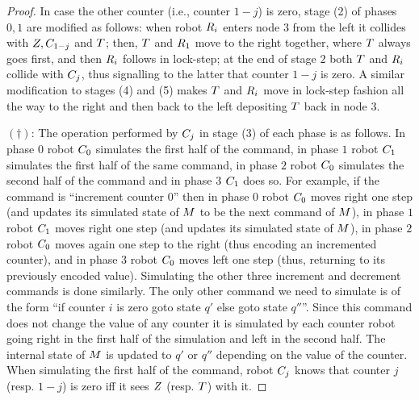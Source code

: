 \begin{proof}
In case the other counter (i.e., counter $1-j$) is zero, stage (2) of phases $0,1$ are modified as follows: when robot $R_i$ enters node $3$ from the left it collides with $Z, C_{1-j}$ and $T$; then, $T$ and $R_1$ move to the right together, where $T$ always goes first, and then $R_i$ follows in lock-step; at the end of stage $2$ both $T$ and $R_i$ collide with $C_j$, thus signalling to the latter that counter $1-j$ is zero. A similar modification to stages (4) and (5) makes $T$ and $R_i$ move in lock-step fashion all the way to the right and then back to the left depositing $T$ back in node $3$.
%


$(\dagger)$: The operation performed by $C_j$ in stage (3) of each phase is as follows.
In phase $0$ robot $C_0$ simulates the first half of the command, in phase $1$ robot $C_1$ simulates the first half of the same command, in phase $2$ robot $C_0$ simulates the second half of the command and in phase $3$ $C_1$ does so. For example, if the command is ``increment counter $0$'' then in phase $0$ robot $C_0$ moves right one step (and updates its simulated state of $M$ to be the next command of $M$), in phase $1$ robot $C_1$ moves right one step (and updates its simulated state of $M$), in phase $2$ robot $C_0$ moves again one step to the right (thus encoding an incremented counter), and in phase $3$ robot $C_0$ moves left one step (thus, returning to its previously encoded value). Simulating the other three increment and decrement commands is done similarly. The only other command we need to simulate is of the form ``if counter $i$ is zero goto state $q'$ else goto state $q''$''. Since this command does not change the value of any counter it is simulated by each counter robot going right in the first half of the simulation and left in the second half. The internal state of $M$ is updated to $q'$ or $q''$ depending on the value of the counter. When simulating the first half of the command, robot $C_j$ knows that counter $j$ (resp. $1-j$) is zero iff it sees $Z$ (resp. $T$) with it.


\end{proof}
